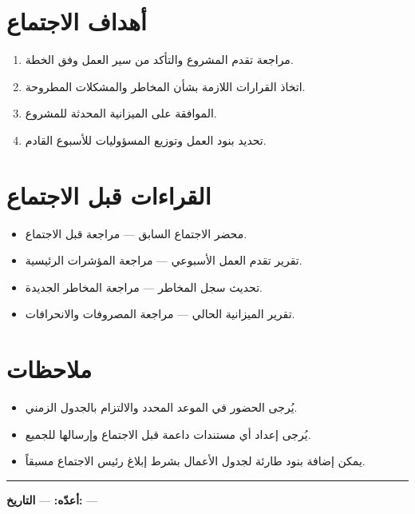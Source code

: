 \documentclass[11pt,a4paper]{article}
\begin{document}
\section{أهداف الاجتماع}
\label{sec:objectives}

\begin{enumerate}
    \item مراجعة تقدم المشروع والتأكد من سير العمل وفق الخطة.
    \item اتخاذ القرارات اللازمة بشأن المخاطر والمشكلات المطروحة.
    \item الموافقة على الميزانية المحدثة للمشروع.
    \item تحديد بنود العمل وتوزيع المسؤوليات للأسبوع القادم.
\end{enumerate}

\section{القراءات قبل الاجتماع}
\label{sec:reading}

\begin{itemize}
    \item محضر الاجتماع السابق --- مراجعة قبل الاجتماع.
    \item تقرير تقدم العمل الأسبوعي --- مراجعة المؤشرات الرئيسية.
    \item تحديث سجل المخاطر --- مراجعة المخاطر الجديدة.
    \item تقرير الميزانية الحالي --- مراجعة المصروفات والانحرافات.
\end{itemize}

\section{ملاحظات}
\label{sec:notes}

\begin{itemize}
    \item يُرجى الحضور في الموعد المحدد والالتزام بالجدول الزمني.
    \item يُرجى إعداد أي مستندات داعمة قبل الاجتماع وإرسالها للجميع.
    \item يمكن إضافة بنود طارئة لجدول الأعمال بشرط إبلاغ رئيس الاجتماع مسبقاً.
\end{itemize}

\vspace{2em}

\noindent\rule{\textwidth}{0.4pt}

\vspace{0.5em}

\begin{flushleft}
\textbf{أعدّه:} --- \hfill \textbf{التاريخ:} ---
\end{flushleft}
\end{document}
